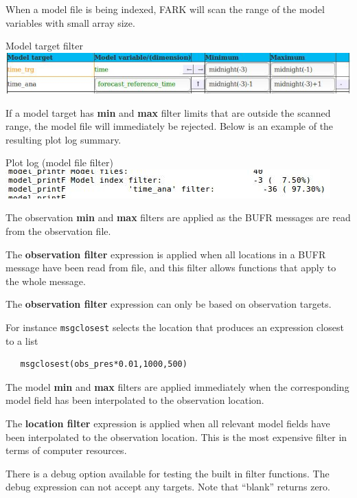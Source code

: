 \documentclass[letterpaper,10pt,twoside,twocolumn,openany]{book}
\begin{document}
When a model file is being indexed, FARK will scan the range of the model variables with small array size.
\begin{paperbox}{Model target filter}
  \includegraphics[width=\columnwidth]{filter_minmax.jpg}
\end{paperbox}
If a model target has {\bf min} and {\bf max} filter limits that are outside the scanned range,
the model file will immediately be rejected. Below is an example of the resulting plot log summary.
\begin{paperbox}{Plot log (model file filter)}
  \includegraphics[width=\columnwidth]{filter_minmaxlog.jpg}
\end{paperbox}

The observation {\bf min} and {\bf max} filters are applied as the BUFR messages are read from the observation file.

The {\bf observation filter} expression is applied when all locations in a BUFR message have been read from file,
and this filter allows functions that apply to the whole message. 
\begin{quotebox}
  The {\bf observation filter} expression can only be based on observation targets.
\end{quotebox}
For instance \lstinline!msgclosest!
selects the location that produces an expression closest to a list
\begin{lstlisting}
   msgclosest(obs_pres*0.01,1000,500)
\end{lstlisting}

The model {\bf min} and {\bf max} filters are applied immediately when the corresponding 
model field has been interpolated to the observation location.

The {\bf location filter} expression is applied when all relevant model fields have been interpolated to the observation location.
This is the most expensive filter in terms of computer resources.

There is a debug option available for testing the built in filter functions.
The debug expression can not accept any targets.
Note that ``blank'' returns zero.
\end{document}
